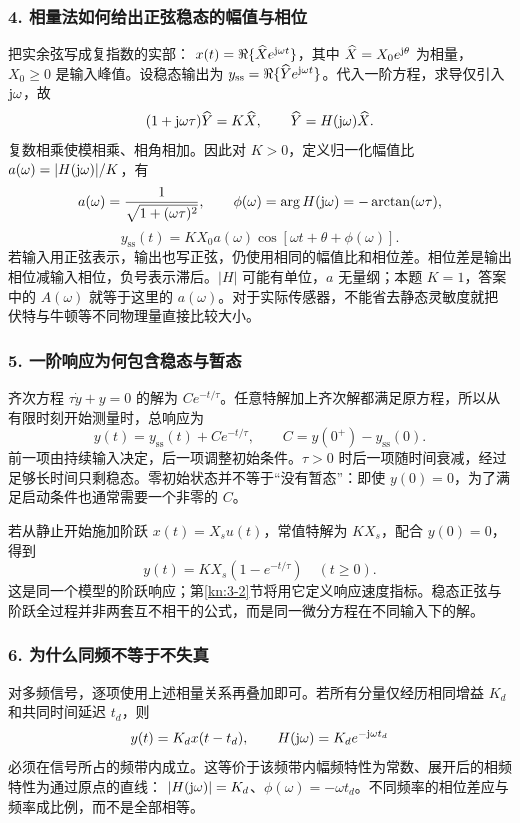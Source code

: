 \subsubsection*{4. 相量法如何给出正弦稳态的幅值与相位}
把实余弦写成复指数的实部：
$x(t)=\Re\{\widehat X e^{\mathrm{j}\omega t}\}$，其中 $\widehat X=X_0e^{\mathrm{j}\theta}$ 为相量，$X_0\geq0$ 是输入峰值。设稳态输出为 $y_{\mathrm{ss}}=\Re\{\widehat Y e^{\mathrm{j}\omega t}\}$。代入一阶方程，求导仅引入 $\mathrm{j}\omega$，故
\[
(1+\mathrm{j}\omega\tau)\widehat Y=K\widehat X,
\qquad \widehat Y=H(\mathrm{j}\omega)\widehat X.
\]
复数相乘使模相乘、相角相加。因此对 $K>0$，定义归一化幅值比 $a(\omega)=|H(\mathrm{j}\omega)|/K$，有
\[
a(\omega)=\frac{1}{\sqrt{1+(\omega\tau)^2}},\qquad
\phi(\omega)=\arg H(\mathrm{j}\omega)=-\arctan(\omega\tau),
\]
\[
\boxed{y_{\mathrm{ss}}(t)=KX_0a(\omega)
\cos[\omega t+\theta+\phi(\omega)]}.
\]
若输入用正弦表示，输出也写正弦，仍使用相同的幅值比和相位差。相位差是输出相位减输入相位，负号表示滞后。$|H|$ 可能有单位，$a$ 无量纲；本题 $K=1$，答案中的 $A(\omega)$ 就等于这里的 $a(\omega)$。对于实际传感器，不能省去静态灵敏度就把伏特与牛顿等不同物理量直接比较大小。

\subsubsection*{5. 一阶响应为何包含稳态与暂态}
齐次方程 $\tau\dot y+y=0$ 的解为 $Ce^{-t/\tau}$。任意特解加上齐次解都满足原方程，所以从有限时刻开始测量时，总响应为
\[
y(t)=y_{\mathrm{ss}}(t)+Ce^{-t/\tau},\qquad
C=y(0^+)-y_{\mathrm{ss}}(0).
\]
前一项由持续输入决定，后一项调整初始条件。$\tau>0$ 时后一项随时间衰减，经过足够长时间只剩稳态。零初始状态并不等于“没有暂态”：即使 $y(0)=0$，为了满足启动条件也通常需要一个非零的 $C$。

若从静止开始施加阶跃 $x(t)=X_su(t)$，常值特解为 $KX_s$，配合 $y(0)=0$，得到
\[
y(t)=KX_s(1-e^{-t/\tau})\quad(t\geq0).
\]
这是同一个模型的阶跃响应；第\ref{kn:3-2}节将用它定义响应速度指标。稳态正弦与阶跃全过程并非两套互不相干的公式，而是同一微分方程在不同输入下的解。

\subsubsection*{6. 为什么同频不等于不失真}
对多频信号，逐项使用上述相量关系再叠加即可。若所有分量仅经历相同增益 $K_d$ 和共同时间延迟 $t_d$，则
\[
y(t)=K_dx(t-t_d),\qquad
H(\mathrm{j}\omega)=K_de^{-\mathrm{j}\omega t_d}
\]
必须在信号所占的频带内成立。这等价于该频带内幅频特性为常数、展开后的相频特性为通过原点的直线：
$|H(\mathrm{j}\omega)|=K_d$、$\phi(\omega)=-\omega t_d$。不同频率的相位差应与频率成比例，而不是全部相等。

